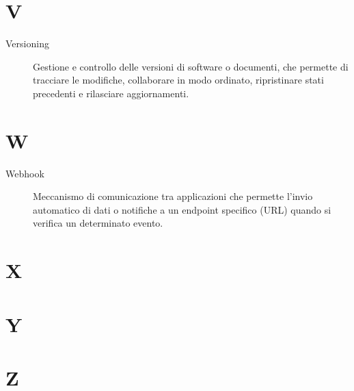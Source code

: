 \section*{V}
\begin{description}
    \item[Versioning] Gestione e controllo delle versioni di software o documenti, che permette di tracciare le modifiche, collaborare in modo ordinato, ripristinare stati precedenti e rilasciare aggiornamenti.
\end{description}


\section*{W}
\begin{description}
    \item[Webhook] Meccanismo di comunicazione tra applicazioni che permette l’invio automatico di dati o notifiche a un endpoint specifico (URL) quando si verifica un determinato evento.  
\end{description}


\section*{X}


\section*{Y}


\section*{Z}
